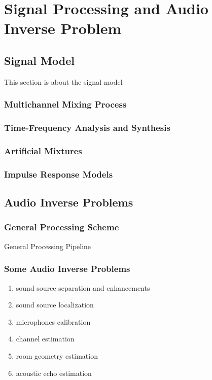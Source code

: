 \chapter{Signal Processing and Audio Inverse Problem}\label{chap:processing}


\section{Signal Model}
This section is about the signal model


\subsection{Multichannel Mixing Process}

\subsection{Time-Frequency Analysis and Synthesis}

\subsection{Artificial Mixtures}

\subsection{Impulse Response Models}





\section{Audio Inverse Problems}

\subsection{General Processing Scheme}
General Processing Pipeline

\subsection{Some Audio Inverse Problems}
\begin{enumerate}
    \item sound source separation and enhancements
    \item sound source localization
    \item microphones calibration
    \item channel estimation
    \item room geometry estimation
    \item acoustic echo estimation
\end{enumerate}


